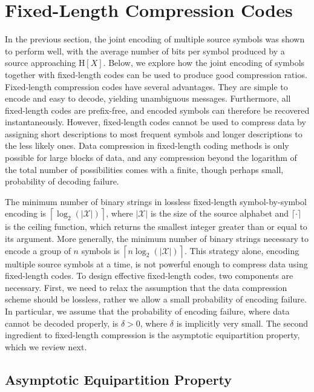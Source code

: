 \section{Fixed-Length Compression Codes}

In the previous section, the joint encoding of multiple source symbols was shown to perform well, with the average number of bits per symbol produced by a source approaching $\mathrm{H}[X]$.
Below, we explore how the joint encoding of symbols together with fixed-length codes can be used to produce good compression ratios.
Fixed-length compression codes have several advantages.
They are simple to encode and easy to decode, yielding unambiguous messages.
Furthermore, all fixed-length codes are prefix-free, and encoded symbols can therefore be recovered instantaneously.
However, fixed-length codes cannot be used to compress data by assigning short descriptions to most frequent symbols and longer descriptions to the less likely ones.
Data compression in fixed-length coding methods is only possible for large blocks of data, and any compression beyond the logarithm of the total number of possibilities comes with a finite, though perhaps small, probability of decoding failure.

The minimum number of binary strings in lossless fixed-length symbol-by-symbol encoding is $\left\lceil \log_2 ( | \mathcal{X} | ) \right\rceil$, where $| \mathcal{X} |$ is the size of the source alphabet and $\lceil \cdot \rceil$ is the ceiling function, which returns the smallest integer greater than or equal to its argument.
More generally, the minimum number of binary strings necessary to encode a group of $n$ symbols is $\left\lceil n \log_2 ( | \mathcal{X} | ) \right\rceil$.
This strategy alone, encoding multiple source symbols at a time, is not powerful enough to compress data using fixed-length codes.
To design effective fixed-length codes, two components are necessary.
First, we need to relax the assumption that the data compression scheme should be lossless, rather we allow a small probability of encoding failure.
In particular, we assume that the probability of encoding failure, where data cannot be decoded properly, is $\delta > 0$, where $\delta$ is implicitly very small.
The second ingredient to fixed-length compression is the asymptotic equipartition property, which we review next.


\subsection{Asymptotic Equipartition Property}

